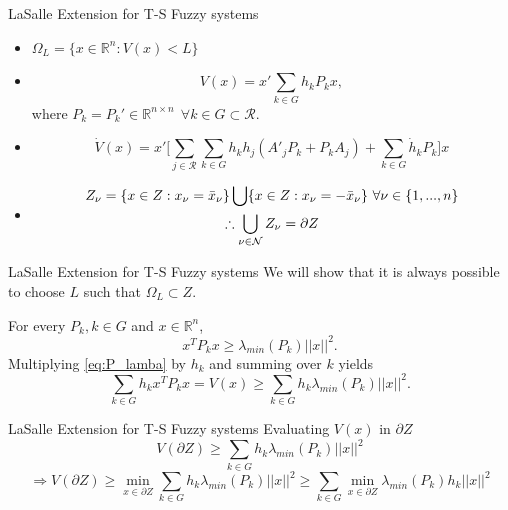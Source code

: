 \begin{frame}{LaSalle Extension for T-S Fuzzy systems}
\begin{itemize}
\item $\Omega_L = \{x \in \mathbb{R}^n : V(x) < L\}$
    \item 
    \begin{equation*}
        V(x) = x'\sum_{k \in G}h_kP_kx,
    \end{equation*}
where $P_k = P_k' \in \mathbb{R}^{n\times n} ~~\forall k \in G \subset \mathcal{R}$.
\item \begin{equation*}
    \dot{V}(x) = x'\big[\sum_{j\in \mathcal R}\sum_{k \in G}h_kh_j(A'_jP_k + P_kA_j)+ \sum_{k \in G}\dot{h}_kP_k\big]x
\end{equation*}
\item \begin{multline*}
    Z_{\nu} = \{x \in Z : x_{\nu} = \Bar{x}_{\nu}\} \bigcup \{x \in Z : x_{\nu} = -\Bar{x}_{\nu}\} ~~\forall \nu \in \{1,...,n\}\\ \therefore
    \bigcup_{\nu \in \mathcal{N}}Z_\nu = \partial Z
\end{multline*}
\end{itemize}
\end{frame}

\begin{frame}{LaSalle Extension for T-S Fuzzy systems}
We will show that it is always possible to choose $L$ such that $\Omega_L \subset Z$. \newline \newline

For every $P_k, k \in G$ and $x \in \mathbb{R}^n$,
\begin{equation} \label{eq:P_lamba}
    x^TP_kx \geq \lambda_{min}(P_k)||x||^2.
\end{equation}
    Multiplying \eqref{eq:P_lamba} by $h_k$ and summing over $k$ yields
\begin{equation}
    \sum_{k \in G}h_kx^TP_kx = V(x) \geq \sum_{k \in G}h_k\lambda_{min}(P_k)||x||^2.
\end{equation}
\end{frame}

\begin{frame}{LaSalle Extension for T-S Fuzzy systems}
Evaluating $V(x)$ in $\partial Z$
\begin{equation} \label{eq:border}
    V(\partial Z) \geq \sum_{k \in G}h_k\lambda_{min}(P_k)||x||^2
\end{equation}
\begin{equation} \label{eq:border}
    \Longrightarrow V(\partial Z) \geq \min_{x \in \partial Z}\sum_{k \in G}h_k\lambda_{min}(P_k)||x||^2 \geq \sum_{k \in G}\min_{x \in \partial Z}\lambda_{min}(P_k)h_k||x||^2
\end{equation}
\end{frame}

